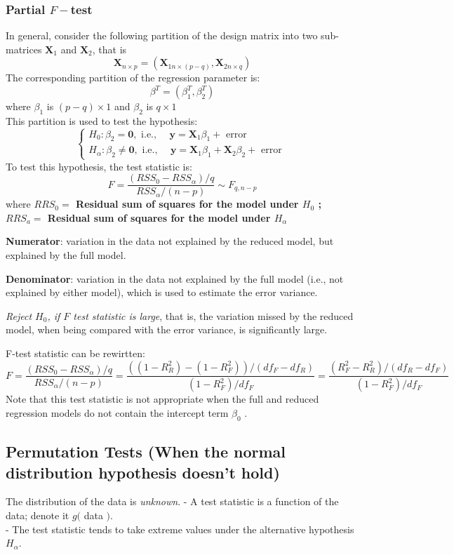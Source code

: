 \documentclass[11pt,a4paper]{article}
\begin{document}
\subsubsection{Partial $F-$test}
In general, consider the following partition of the design matrix into two sub-matrices $\mathbf{X}_{1}$ and $\mathbf{X}_{2}$, that is
$$
\mathbf{X}_{n \times p}=\left(\mathbf{X}_{1 n \times(p-q)}, \mathbf{X}_{2 n \times q}\right)
$$
The corresponding partition of the regression parameter is:
$$
\beta^{T}=\left(\beta_{1}^{T}, \beta_{2}^{T}\right)
$$
where $\beta_{1}$ is $(p-q) \times 1$ and $\beta_{2}$ is $q \times 1$\\
This partition is used to test the hypothesis:
$$
\left\{\begin{array}{l}
H_{0}: \beta_{2}=\mathbf{0}, \text { i.e., } \quad \mathbf{y}=\mathbf{X}_{1} \beta_{1}+\text { error } \\
H_{\alpha}: \beta_{2} \neq \mathbf{0}, \text { i.e., }\quad \mathbf{y}=\mathbf{X}_{1} \beta_{1}+\mathbf{X}_{2} \beta_{2}+\text { error }
\end{array}\right.
$$
To test this hypothesis, the test statistic is:
$$
F=\frac{\left(R S S_{0}-R S S_{\alpha}\right) / q}{R S S_{\alpha} /(n-p)} \sim F_{q, n-p}
$$
where \textbf{$R R S_{0}=$ Residual sum of squares for the model under $H_{0}$ ; $R R S_{a}=$ Residual sum of squares for the model under $H_{\alpha}$}

\textbf{Numerator}: variation in the data not explained by the reduced model, but explained by the full model.

\textbf{Denominator}: variation in the data not explained by the full model (i.e., not explained by either model), which is used to estimate the error variance.

\textit{Reject $H_{0}$, if $F$ test statistic is large}, that is, the variation missed by the reduced model, when being compared with the error variance, is significantly large.

F-test statistic can be rewirtten:
$$F=\frac{(RSS_{0}-RSS_{\alpha})/q}{RSS_{\alpha}/(n-p)}=\frac{((1-R_R^2)-(1-R_F^2))/(df_F-df_R)}{(1-R_F^2)/df_F}=\frac{(R_F^2-R_R^2)/(df_R-df_F)}{(1-R_F^2)/df_F}$$
Note that this test statistic is not appropriate when the full and reduced regression models do not contain the intercept term $\beta_0$ .

\subsection{Permutation Tests (When the normal distribution hypothesis doesn't hold)}
The distribution of the data is \textit{unknown}.
- A test statistic is a function of the data; denote it $g($ data $)$.\\
- The test statistic tends to take extreme values under the alternative hypothesis $H_{\alpha}$.
\end{document}
